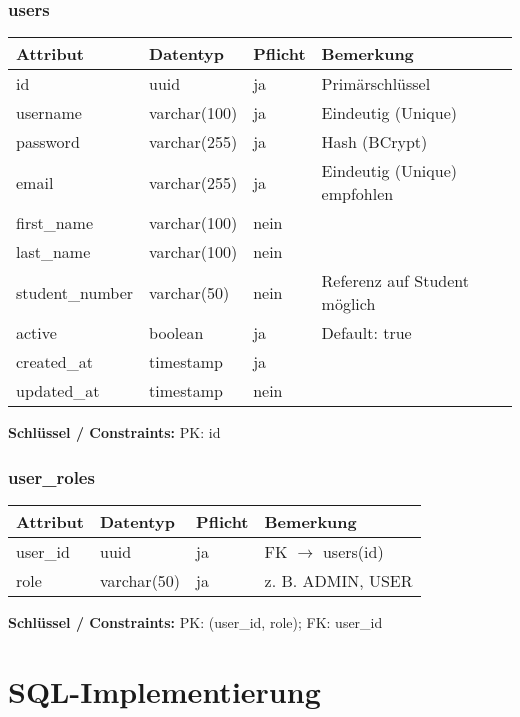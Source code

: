 \documentclass[12pt,a4paper]{article}
\begin{document}
    \subsubsection{users}
    \begin{longtable}{|p{4cm}|p{3cm}|p{3cm}|p{4cm}|}
        \hline
        \textbf{Attribut} & \textbf{Datentyp} & \textbf{Pflicht} & \textbf{Bemerkung} \\ \hline
        id & uuid & ja & Primärschlüssel \\ \hline
        username & varchar(100) & ja & Eindeutig (Unique) \\ \hline
        password & varchar(255) & ja & Hash (BCrypt) \\ \hline
        email & varchar(255) & ja & Eindeutig (Unique) empfohlen \\ \hline
        first\_name & varchar(100) & nein &  \\ \hline
        last\_name & varchar(100) & nein &  \\ \hline
        student\_number & varchar(50) & nein & Referenz auf Student möglich \\ \hline
        active & boolean & ja & Default: true \\ \hline
        created\_at & timestamp & ja &  \\ \hline
        updated\_at & timestamp & nein &  \\ \hline
    \end{longtable}
    \textbf{Schlüssel / Constraints:} PK: id

    \subsubsection{user\_roles}
    \begin{longtable}{|p{4cm}|p{3cm}|p{3cm}|p{4cm}|}
        \hline
        \textbf{Attribut} & \textbf{Datentyp} & \textbf{Pflicht} & \textbf{Bemerkung} \\ \hline
        user\_id & uuid & ja & FK $\rightarrow$ users(id) \\ \hline
        role & varchar(50) & ja & z. B. ADMIN, USER \\ \hline
    \end{longtable}
    \textbf{Schlüssel / Constraints:} PK: (user\_id, role); FK: user\_id
    \newpage


    \section{SQL-Implementierung}
\end{document}
